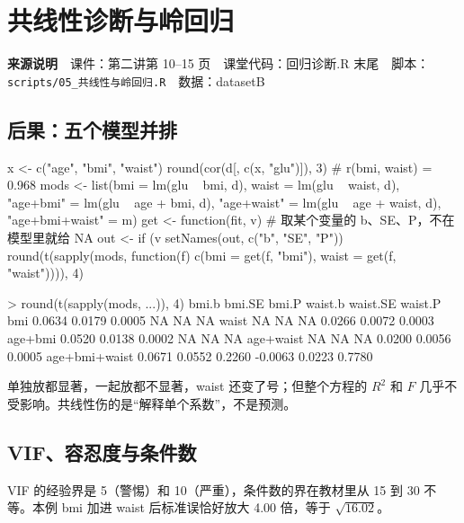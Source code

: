 \chapter{共线性诊断与岭回归}

\begin{studysource}
\textbf{来源说明}　课件：第二讲第 10–15 页　课堂代码：回归诊断.R 末尾　脚本：\texttt{scripts/05\_共线性与岭回归.R}　数据：datasetB
\end{studysource}


\section{后果：五个模型并排}
\begin{rcode}
x <- c("age", "bmi", "waist")
round(cor(d[, c(x, "glu")]), 3)                  # r(bmi, waist) = 0.968
mods <- list(bmi = lm(glu ~ bmi, d), waist = lm(glu ~ waist, d),
             "age+bmi" = lm(glu ~ age + bmi, d), "age+waist" = lm(glu ~ age + waist, d),
             "age+bmi+waist" = m)
get <- function(fit, v) {                        # 取某个变量的 b、SE、P，不在模型里就给 NA
  out <- if (v %
  setNames(out, c("b", "SE", "P"))
}
round(t(sapply(mods, function(f) c(bmi = get(f, "bmi"), waist = get(f, "waist")))), 4)
\end{rcode}
\begin{routput}
> round(t(sapply(mods, ...)), 4)
               bmi.b bmi.SE  bmi.P waist.b waist.SE waist.P
bmi           0.0634 0.0179 0.0005      NA       NA      NA
waist             NA     NA     NA  0.0266   0.0072  0.0003
age+bmi       0.0520 0.0138 0.0002      NA       NA      NA
age+waist         NA     NA     NA  0.0200   0.0056  0.0005
age+bmi+waist 0.0671 0.0552 0.2260 -0.0063   0.0223  0.7780
\end{routput}
单独放都显著，一起放都不显著，waist 还变了号；但整个方程的 $R^2$ 和 $F$ 几乎不受影响。共线性伤的是“解释单个系数”，不是预测。

\section{VIF、容忍度与条件数}
VIF 的经验界是 5（警惕）和 10（严重），条件数的界在教材里从 15 到 30 不等。本例 bmi 加进 waist 后标准误恰好放大 4.00 倍，等于 $$。


